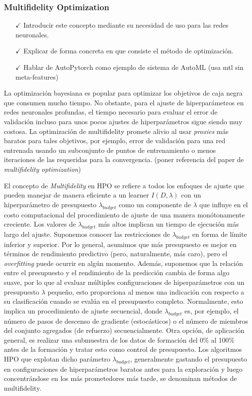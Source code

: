 \subsubsection{Multifidelity Optimization}


\begin{itemize}
	\item[$\checkmark$] Introducir este concepto mediante su necesidad de uso para las redes neuronales.
	\item[$\checkmark$] Explicar de forma concreta en que consiste el método de optimización.
	\item[$\checkmark$] Hablar de AutoPytorch como ejemplo de sistema de AutoML (usa mtl sin meta-features)
\end{itemize}

La optimización bayesiana es popular para optimizar los objetivos de caja negra que consumen mucho tiempo. No obstante, para el ajuste de hiperparámetros en redes neuronales profundas, el tiempo necesario para evaluar el error de validación incluso para unos pocos ajustes de hiperparámetros sigue siendo muy costosa. La optimización de multifidelity promete alivio al usar \emph{proxies} más baratos para tales objetivos, por ejemplo, error de validación para una red entrenada usando un subconjunto de puntos de entrenamiento o menos iteraciones de las requeridas para la convergencia. (poner referencia del paper de \textit{multifidelity optimization})

El concepto de \textit{Multifidelity} en HPO se refiere a todos los enfoques de ajuste que pueden manejar de manera eficiente a un learner $I(D, \lambda)$ con un hiperparámetro de presupuesto $\lambda_{budget}$ como un componente de $\lambda$ que influye en el costo computacional del procedimiento de ajuste de una manera monótonamente creciente. Los valores de $\lambda_{budget}$ más altos implican un tiempo de ejecución más largo del ajuste. Suponemos conocer las restricciones de $\lambda_{budget}$ en forma de límite inferior y superior. Por lo general, asumimos que más presupuesto es mejor en términos de rendimiento predictivo (pero, naturalmente, más caro), pero el \textit{overfitting} puede ocurrir en algún momento. Además, suponemos que la relación entre el presupuesto y el rendimiento de la predicción cambia de forma algo suave, por lo que al evaluar múltiples configuraciones de hiperparámetros con un presupuesto $\lambda$ pequeño, esto proporciona al menos una indicación con respecto a su clasificación cuando se evalúa en el presupuesto completo. Normalmente, esto implica un procedimiento de ajuste secuencial, donde $\lambda_{budget}$ es, por ejemplo,  el número de pasos de descenso de gradiente (estocásticos) o el número de miembros del conjunto agregados (de refuerzo) secuencialmente. Otra opción, de aplicación general, es realizar una submuestra de los datos de formación del 0\% al 100\% antes de la formación y tratar esto como control de presupuesto. Los algoritmos HPO que explotan dicho parámetro $\lambda_{budget}$, generalmente gastando el presupuesto en configuraciones de hiperparámetros baratos antes para la exploración y luego concentrándose en los más prometedores más tarde, se denominan métodos de multifidelity.

